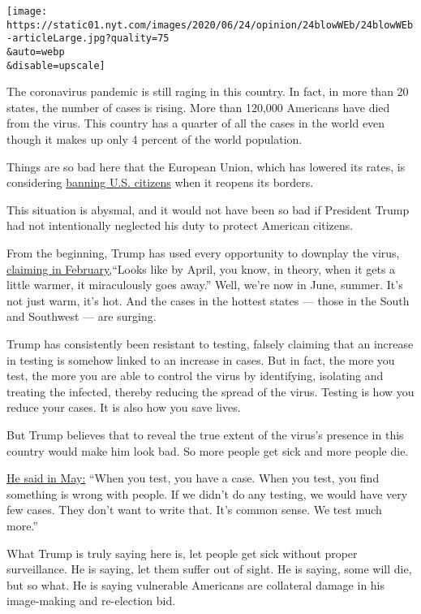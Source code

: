 \texttt{[image: https://static01.nyt.com/images/2020/06/24/opinion/24blowWEb/24blowWEb-articleLarge.jpg?quality=75\\\&auto=webp\\\&disable=upscale]}

The coronavirus pandemic is still raging in this country. In fact, in
more than 20 states, the number of cases is rising. More than 120,000
Americans have died from the virus. This country has a quarter of all
the cases in the world even though it makes up only 4 percent of the
world population.

Things are so bad here that the European Union, which has lowered its
rates, is considering
\href{https://www.nytimes.com/2020/06/23/world/europe/coronavirus-EU-American-travel-ban.html}{banning
U.S. citizens} when it reopens its borders.

This situation is abysmal, and it would not have been so bad if
President Trump had not intentionally neglected his duty to protect
American citizens.

From the beginning, Trump has used every opportunity to downplay the
virus,
\href{https://factba.se/transcript/donald-trump-speech-kag-rally-manchester-new-hampshire-february-10-2020}{claiming
in February,}``Looks like by April, you know, in theory, when it gets a
little warmer, it miraculously goes away.'' Well, we're now in June,
summer. It's not just warm, it's hot. And the cases in the hottest
states --- those in the South and Southwest --- are surging.

Trump has consistently been resistant to testing, falsely claiming that
an increase in testing is somehow linked to an increase in cases. But in
fact, the more you test, the more you are able to control the virus by
identifying, isolating and treating the infected, thereby reducing the
spread of the virus. Testing is how you reduce your cases. It is also
how you save lives.

But Trump believes that to reveal the true extent of the virus's
presence in this country would make him look bad. So more people get
sick and more people die.

\href{https://www.marketwatch.com/story/trump-says-coronavirus-testing-overratedclaims-fewer-cases-if-no-testing-2020-05-14}{He
said in May:} ``When you test, you have a case. When you test, you find
something is wrong with people. If we didn't do any testing, we would
have very few cases. They don't want to write that. It's common sense.
We test much more.''

What Trump is truly saying here is, let people get sick without proper
surveillance. He is saying, let them suffer out of sight. He is saying,
some will die, but so what. He is saying vulnerable Americans are
collateral damage in his image-making and re-election bid.

